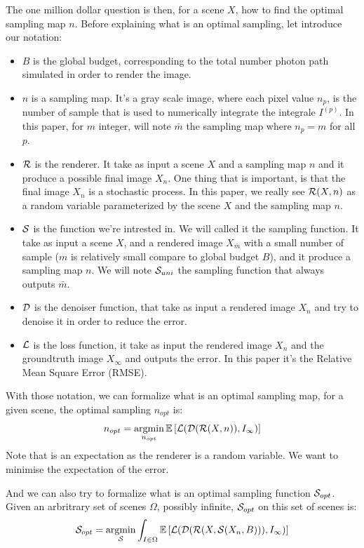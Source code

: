 \documentclass{classeENS}
\begin{document}
\par The one million dollar question is then, for a scene $X$, how to find the optimal
sampling map $n$. Before explaining what is an optimal sampling, let introduce our notation:
\begin{itemize}
    \item $B$ is the global budget, corresponding to the total number photon path simulated
    in order to render the image.
    \item $n$ is a sampling map. It's a gray scale image, where each pixel value $n_p$, is the
    number of sample that is used to numerically integrate the integrale $I^{(p)}$. In this paper,
    for $m$ integer, will note $\bar m$ the sampling map where $n_p = m$ for all $p$.
    \item $\mathcal R$ is the renderer. It take as input a scene $X$ and a sampling map $n$ and it produce
    a possible final image $X_n$. One thing that is important, is that the final image $X_n$ is a 
    stochastic process. In this paper, we really see $\mathcal R(X,n)$ 
    as a random variable parameterized by the scene $X$ and the sampling map $n$.
    \item $\mathcal S$ is the function we're intrested in. We will called it the sampling function. 
    It take as input a scene $X$, and a rendered image $X_{\bar m}$ with a small number 
    of sample ($m$ is relatively small compare to global budget $B$), and it produce a sampling map $n$.
    We will note $\mathcal S_{uni}$ the sampling function that always outputs $\bar m$.
    \item $\mathcal D$ is the denoiser function, that take as input a rendered image $X_n$ and try to
    denoise it in order to reduce the error.
    \item $\mathcal L$ is the loss function, it take as input the rendered image $X_n$ and the groundtruth 
    image $X_\infty$ and outputs the error. In this paper it's the Relative Mean Square Error (RMSE).
\end{itemize}
With those notation, we can formalize what is an optimal sampling map, for a given scene, 
the optimal sampling $n_{opt}$ is:
\begin{equation}
    \label{eq:0}
    n_{opt} = \operatorname*{argmin}_{n_{opt}} \mathbb E \left [ \mathcal L (\mathcal D (\mathcal R(X, n)), I_\infty) \right ]
\end{equation}
Note that is an expectation as the renderer is a random variable. We want to minimise the 
expectation of the error.

\par And we can also try to formalize what is an optimal sampling function $\mathcal S_{opt}$.
Given an arbritrary set of scenes $\Omega$, possibly infinite, $\mathcal S_{opt}$ on this set of 
scenes is:
\begin{equation}
    \label{eq:1}
    \mathcal S_{opt} = \operatorname*{argmin}_{\mathcal S} \int_{I\in\Omega} \mathbb E \left [ \mathcal L (\mathcal D (\mathcal R(X, \mathcal S(X_n, B))), I_\infty) \right ]
\end{equation}
\end{document}
